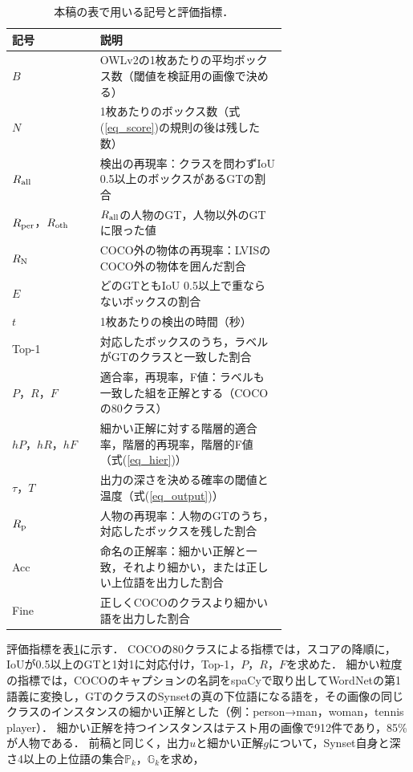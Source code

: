 \begin{table}[t]
\centering
\caption{本稿の表で用いる記号と評価指標．}
\label{tab_metrics}
\setlength{\tabcolsep}{3pt}
\begin{tabular}{lp{0.68\linewidth}}
\toprule
記号 & 説明 \\
\midrule
$ B $ & OWLv2の1枚あたりの平均ボックス数（閾値を検証用の画像で決める） \\
$ N $ & 1枚あたりのボックス数（式(\ref{eq_score})の規則の後は残した数） \\
$ R_{\rm all} $ & 検出の再現率：クラスを問わずIoU 0.5以上のボックスがあるGTの割合 \\
$ R_{\rm per} $，$ R_{\rm oth} $ & $ R_{\rm all} $の人物のGT，人物以外のGTに限った値 \\
$ R_{\rm N} $ & COCO外の物体の再現率：LVISのCOCO外の物体を囲んだ割合 \\
$ E $ & どのGTともIoU 0.5以上で重ならないボックスの割合 \\
$ t $ & 1枚あたりの検出の時間（秒） \\
Top-1 & 対応したボックスのうち，ラベルがGTのクラスと一致した割合 \\
$ P $，$ R $，$ F $ & 適合率，再現率，F値：ラベルも一致した組を正解とする（COCOの80クラス） \\
$ hP $，$ hR $，$ hF $ & 細かい正解に対する階層的適合率，階層的再現率，階層的F値（式(\ref{eq_hier})） \\
$ \tau $，$ T $ & 出力の深さを決める確率の閾値と温度（式(\ref{eq_output})） \\
$ R_{\rm p} $ & 人物の再現率：人物のGTのうち，対応したボックスを残した割合 \\
Acc & 命名の正解率：細かい正解と一致，それより細かい，または正しい上位語を出力した割合 \\
Fine & 正しくCOCOのクラスより細かい語を出力した割合 \\
\bottomrule
\end{tabular}
\end{table}

評価指標を表\ref{tab_metrics}に示す．
COCOの80クラスによる指標では，スコアの降順に，IoUが0.5以上のGTと1対1に対応付け，Top-1，$ P $，$ R $，$ F $を求めた．
細かい粒度の指標では，COCOのキャプションの名詞をspaCyで取り出してWordNetの第1語義に変換し，GTのクラスのSynsetの真の下位語になる語を，その画像の同じクラスのインスタンスの細かい正解とした（例：person→man，woman，tennis player）．
細かい正解を持つインスタンスはテスト用の画像で912件であり，85\%が人物である．
前稿\cite{ref_prevVG}と同じく，出力$ u $と細かい正解$ g $について，Synset自身と深さ4以上の上位語の集合$ {\mathbb P}_k $，$ {\mathbb G}_k $を求め，

